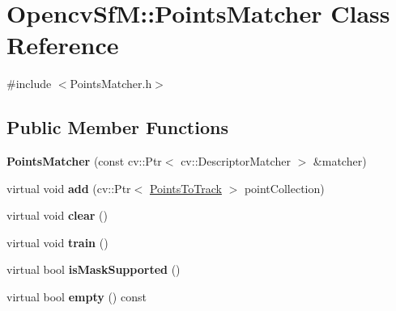 \hypertarget{class_opencv_sf_m_1_1_points_matcher}{
\section{OpencvSfM::PointsMatcher Class Reference}
\label{class_opencv_sf_m_1_1_points_matcher}
}


{\ttfamily \#include $<$PointsMatcher.h$>$}

\subsection*{Public Member Functions}
\begin{DoxyCompactItemize}
\item 
\hypertarget{class_opencv_sf_m_1_1_points_matcher_a6e28c42636e34e8c29d255202869598b}{
{\bfseries PointsMatcher} (const cv::Ptr$<$ cv::DescriptorMatcher $>$ \&matcher)}
\label{class_opencv_sf_m_1_1_points_matcher_a6e28c42636e34e8c29d255202869598b}

\item 
\hypertarget{class_opencv_sf_m_1_1_points_matcher_a0f5001301f3cdd4b24f4495dfe307742}{
virtual void {\bfseries add} (cv::Ptr$<$ \hyperlink{class_opencv_sf_m_1_1_points_to_track}{PointsToTrack} $>$ pointCollection)}
\label{class_opencv_sf_m_1_1_points_matcher_a0f5001301f3cdd4b24f4495dfe307742}

\item 
\hypertarget{class_opencv_sf_m_1_1_points_matcher_ac4d214492d8659c36715f79ebb19fc0d}{
virtual void {\bfseries clear} ()}
\label{class_opencv_sf_m_1_1_points_matcher_ac4d214492d8659c36715f79ebb19fc0d}

\item 
\hypertarget{class_opencv_sf_m_1_1_points_matcher_a0772137e424d1cd562d6e6600601d917}{
virtual void {\bfseries train} ()}
\label{class_opencv_sf_m_1_1_points_matcher_a0772137e424d1cd562d6e6600601d917}

\item 
\hypertarget{class_opencv_sf_m_1_1_points_matcher_a4b3d7673ff8e8cdbf1780dda26acd151}{
virtual bool {\bfseries isMaskSupported} ()}
\label{class_opencv_sf_m_1_1_points_matcher_a4b3d7673ff8e8cdbf1780dda26acd151}

\item 
\hypertarget{class_opencv_sf_m_1_1_points_matcher_a29e94f44fd1726cac6833c233145cf3f}{
virtual bool {\bfseries empty} () const }
\label{class_opencv_sf_m_1_1_points_matcher_a29e94f44fd1726cac6833c233145cf3f}


\end{DoxyCompactItemize}
